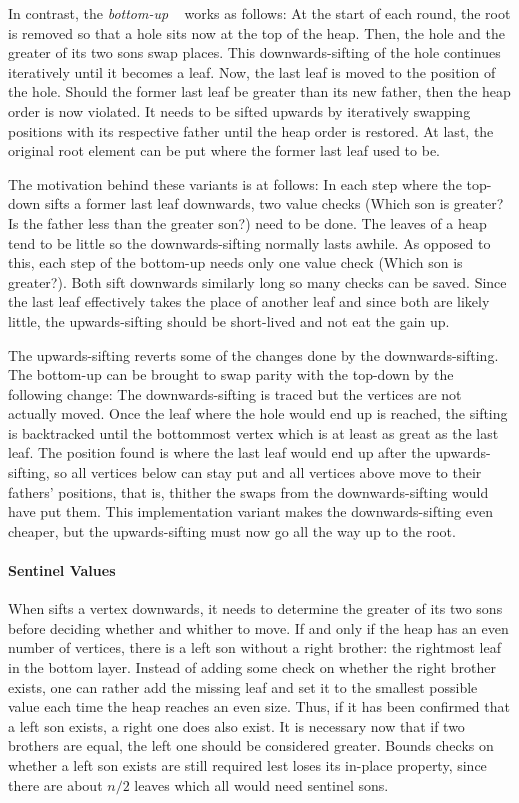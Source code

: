 In contrast, the \emph{bottom-up} \HS{}~\cite{wegener1993heapsort} works as follows:
At the start of each round, the root is removed so that a hole sits now at the top of the heap.
Then, the hole and the greater of its two sons swap places.
This downwards-sifting of the hole continues iteratively until it becomes a leaf.
Now, the last leaf is moved to the position of the hole.
Should the former last leaf be greater than its new father, then the heap order is now violated.
It needs to be sifted upwards by iteratively swapping positions with its respective father until the heap order is restored.
At last, the original root element can be put where the former last leaf used to be.

The motivation behind these variants is at follows:
In each step where the top-down \HS{} sifts a former last leaf downwards, two value checks (Which son is greater? Is the father less than the greater son?) need to be done.
The leaves of a heap tend to be little so the downwards-sifting normally lasts awhile.
As opposed to this, each step of the bottom-up \HS{} needs only one value check (Which son is greater?).
Both \HS*{} sift downwards similarly long so many checks can be saved.
Since the last leaf effectively takes the place of another leaf and since both are likely little, the upwards-sifting should be short-lived and not eat the gain up.

The upwards-sifting reverts some of the changes done by the downwards-sifting.
The bottom-up \HS{} can be brought to swap parity with the top-down \HS{} by the following change:
The downwards-sifting is traced but the vertices are not actually moved.
Once the leaf where the hole would end up is reached, the sifting is backtracked until the bottommost vertex which is at least as great as the last leaf.
The position found is where the last leaf would end up after the upwards-sifting, so all vertices below can stay put and all vertices above move to their fathers' positions, that is, thither the swaps from the downwards-sifting would have put them.
This implementation variant makes the downwards-sifting even cheaper, but the upwards-sifting must now go all the way up to the root.


\paragraph{Sentinel Values}
When \HS{} sifts a vertex downwards, it needs to determine the greater of its two sons before deciding whether and whither to move.
If and only if the heap has an even number of vertices, there is a left son without a right brother:
the rightmost leaf in the bottom layer.
Instead of adding some check on whether the right brother exists, one can rather add the missing leaf and set it to the smallest possible value each time the heap reaches an even size.
Thus, if it has been confirmed that a left son exists, a right one does also exist.
It is necessary now that if two brothers are equal, the left one should be considered greater.
Bounds checks on whether a left son exists are still required lest \HS{} loses its in-place property, since there are about \(n/2\) leaves which all would need sentinel sons.

